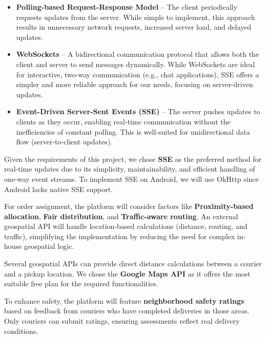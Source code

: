 \documentclass[a4paper,twoside,11pt]{article}
\begin{document}
\begin{itemize}
    \item \textbf{Polling-based Request-Response Model} – The client periodically requests updates from the server. While simple to implement, this approach results in unnecessary network requests, increased server load, and delayed updates.
    \item \textbf{WebSockets} – A bidirectional communication protocol that allows both the client and server to send messages dynamically. While WebSockets are ideal for interactive, two-way communication (e.g., chat applications), SSE offers a simpler and more reliable approach for our needs, focusing on server-driven updates.
    \item \textbf{Event-Driven Server-Sent Events (SSE)} – The server pushes updates to clients as they occur, enabling real-time communication without the inefficiencies of constant polling. This is well-suited for unidirectional data flow (server-to-client updates).
\end{itemize}

Given the requirements of this project, we chose \textbf{SSE} as the preferred method for real-time updates due to its simplicity, maintainability, and efficient handling of one-way event streams. To implement SSE on Android, we will use OkHttp since Android lacks native SSE support.

\vspace{2mm}

For order assignment, the platform will consider factors like \textbf{Proximity-based allocation}, \textbf{Fair distribution}, and \textbf{Traffic-aware routing}. An external geospatial API will handle location-based calculations (distance, routing, and traffic), simplifying the implementation by reducing the need for complex in-house geospatial logic.

\vspace{2mm}

Several geospatial APIs can provide direct distance calculations between a courier and a pickup location. We chose the \textbf{Google Maps API} as it offers the most suitable free plan for the required functionalities.

\vspace{2mm}

To enhance safety, the platform will feature \textbf{neighborhood safety ratings} based on feedback from couriers who have completed deliveries in those areas. Only couriers can submit ratings, ensuring assessments reflect real delivery conditions.  
\end{document}
